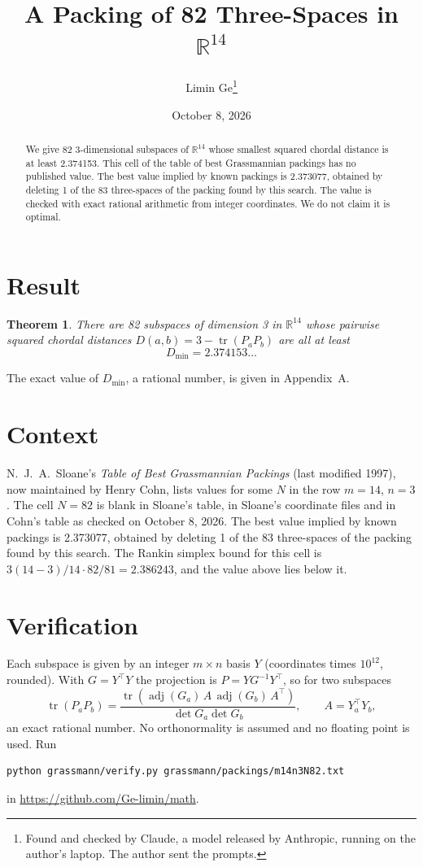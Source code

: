 \documentclass[11pt,a4paper]{article}
\title{A Packing of 82 Three-Spaces in $\mathbb{R}^{14}$}
\author{Limin Ge\thanks{Found and checked by Claude, a model released by Anthropic, running on the author's laptop. The author sent the prompts.}}
\date{October 8, 2026}
\newtheorem*{theorem}{Theorem}
\begin{document}
\maketitle
\begin{abstract}
We give 82 3-dimensional subspaces of $\mathbb{R}^{14}$ whose smallest squared chordal distance is at least 2.374153. This cell of the table of best Grassmannian packings has no published value. The best value implied by known packings is 2.373077, obtained by deleting 1 of the 83 three-spaces of the packing found by this search. The value is checked with exact rational arithmetic from integer coordinates. We do not claim it is optimal.
\end{abstract}

\section{Result}
\begin{theorem}
There are 82 subspaces of dimension 3 in $\mathbb{R}^{14}$ whose pairwise squared chordal distances $D(a,b) = 3 - \operatorname{tr}(P_aP_b)$ are all at least
\[ D_{\min} = 2.374153\ldots \]
\end{theorem}
The exact value of $D_{\min}$, a rational number, is given in Appendix~A.


\section{Context}
N.~J.~A.~Sloane's \emph{Table of Best Grassmannian Packings} (last modified 1997), now maintained by Henry Cohn, lists values for some $N$ in the row $m=14$, $n=3$. The cell $N=82$ is blank in Sloane's table, in Sloane's coordinate files and in Cohn's table as checked on October 8, 2026. The best value implied by known packings is 2.373077, obtained by deleting 1 of the 83 three-spaces of the packing found by this search. The Rankin simplex bound for this cell is $3(14-3)/14\cdot 82/81 = 2.386243$, and the value above lies below it.


\section{Verification}
Each subspace is given by an integer $m\times n$ basis $Y$ (coordinates times $10^{12}$, rounded). With $G=Y^\top Y$ the projection is $P=YG^{-1}Y^\top$, so for two subspaces
\[ \operatorname{tr}(P_aP_b)=\frac{\operatorname{tr}(\operatorname{adj}(G_a)\,A\,\operatorname{adj}(G_b)\,A^\top)}{\det G_a\det G_b},\qquad A=Y_a^\top Y_b, \]
an exact rational number. No orthonormality is assumed and no floating point is used. Run
\begin{verbatim}
python grassmann/verify.py grassmann/packings/m14n3N82.txt
\end{verbatim}
in \url{https://github.com/Ge-limin/math}.
\end{document}
